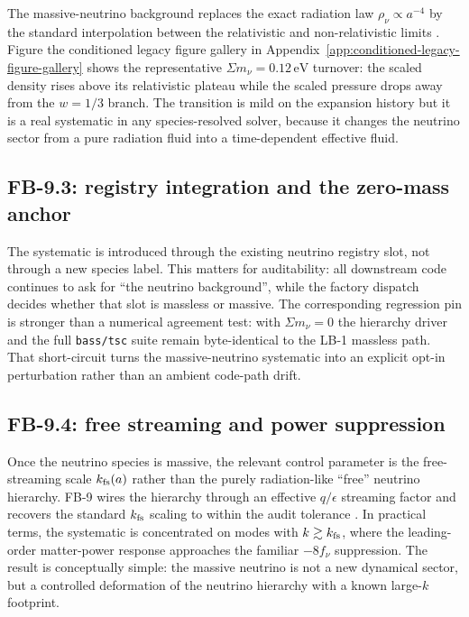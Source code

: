 The massive-neutrino background replaces the exact radiation law
$\rho_\nu \propto a^{-4}$ by the standard interpolation between the
relativistic and non-relativistic limits
\cite{MaBertschinger1995,LesgourguesTram2011}.  Figure
the conditioned legacy figure gallery in Appendix~\ref{app:conditioned-legacy-figure-gallery} shows the representative
$\Sigma m_\nu = 0.12\,\mathrm{eV}$ turnover: the scaled density rises
above its relativistic plateau while the scaled pressure drops away from
the $w = 1/3$ branch.  The transition is mild on the expansion history
but it is a real systematic in any species-resolved solver, because it
changes the neutrino sector from a pure radiation fluid into a
time-dependent effective fluid.

\subsection{FB-9.3: registry integration and the zero-mass anchor}

The systematic is introduced through the existing neutrino registry
slot, not through a new species label.  This matters for auditability:
all downstream code continues to ask for ``the neutrino background'',
while the factory dispatch decides whether that slot is massless or
massive.  The corresponding regression pin is stronger than a numerical
agreement test: with $\Sigma m_\nu = 0$ the hierarchy driver and the
full \texttt{bass/tsc} suite remain byte-identical to the LB-1 massless
path.
That short-circuit turns the massive-neutrino systematic into an
explicit opt-in perturbation rather than an ambient code-path drift.

\subsection{FB-9.4: free streaming and power suppression}

Once the neutrino species is massive, the relevant control parameter is
the free-streaming scale $k_{\rm fs}(a)$ rather than the purely
radiation-like ``free'' neutrino hierarchy.  FB-9 wires the hierarchy
through an effective $q/\epsilon$ streaming factor and recovers the
standard $k_{\rm fs}$ scaling to within the audit tolerance
\cite{LesgourguesTram2011,HuEisensteinTegmark1998}.  In practical terms,
the systematic is concentrated on modes with $k \gtrsim k_{\rm fs}$,
where the leading-order matter-power response approaches the familiar
$-8 f_\nu$ suppression.  The result is conceptually simple: the massive
neutrino is not a new dynamical sector, but a controlled deformation of
the neutrino hierarchy with a known large-$k$ footprint.

